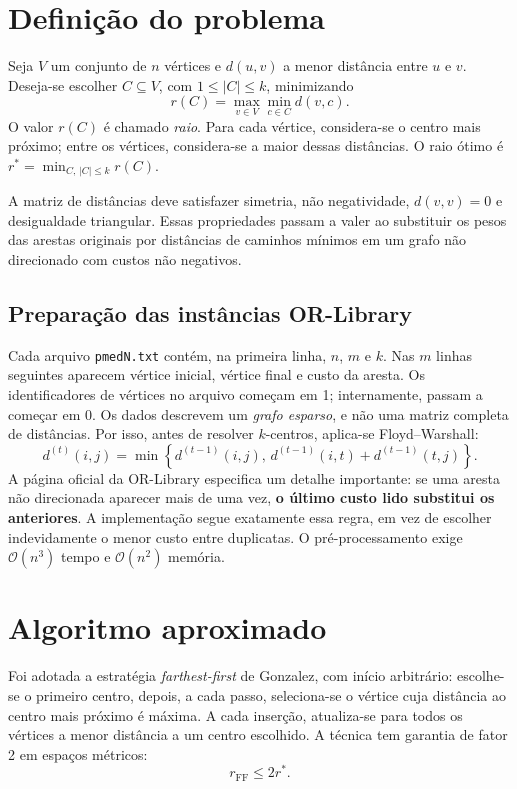 \documentclass[12pt,a4paper]{article}
\newcommand{\bigO}[1]{\mathcal O\!\left(#1\right)}
\begin{document}
\section{Definição do problema}
Seja $V$ um conjunto de $n$ vértices e $d(u,v)$ a menor distância entre
$u$ e $v$. Deseja-se escolher $C\subseteq V$, com $1\leq |C|\leq k$, minimizando
\begin{equation}\label{eq:objetivo}
 r(C)=\max_{v\in V}\min_{c\in C}d(v,c).
\end{equation}
O valor $r(C)$ é chamado \emph{raio}. Para cada vértice, considera-se o
centro mais próximo; entre os vértices, considera-se a maior dessas distâncias.
O raio ótimo é $r^*=\min_{C,\,|C|\leq k}r(C)$.

A matriz de distâncias deve satisfazer simetria, não negatividade,
$d(v,v)=0$ e desigualdade triangular. Essas propriedades passam a valer
ao substituir os pesos das arestas originais por distâncias de caminhos
mínimos em um grafo não direcionado com custos não negativos.

\subsection{Preparação das instâncias OR-Library}
Cada arquivo \texttt{pmedN.txt} contém, na primeira linha, $n$, $m$ e $k$.
Nas $m$ linhas seguintes aparecem vértice inicial, vértice final e custo
da aresta. Os identificadores de vértices no arquivo começam em 1;
internamente, passam a começar em 0. Os dados descrevem um \emph{grafo
esparso}, e não uma matriz completa de distâncias. Por isso, antes de
resolver $k$-centros, aplica-se Floyd--Warshall:
\begin{equation}
 d^{(t)}(i,j)=\min\left\{d^{(t-1)}(i,j),\,
 d^{(t-1)}(i,t)+d^{(t-1)}(t,j)\right\}.
\end{equation}
A página oficial da OR-Library especifica um detalhe importante: se uma
aresta não direcionada aparecer mais de uma vez, \textbf{o último custo
lido substitui os anteriores}. A implementação segue exatamente essa regra,
em vez de escolher indevidamente o menor custo entre duplicatas.
O pré-processamento exige $\bigO{n^3}$ tempo e $\bigO{n^2}$ memória.

\section{Algoritmo aproximado}
Foi adotada a estratégia \emph{farthest-first} de Gonzalez, com início
arbitrário: escolhe-se o primeiro centro, depois, a cada passo, seleciona-se
o vértice cuja distância ao centro mais próximo é máxima. A cada inserção,
atualiza-se para todos os vértices a menor distância a um centro escolhido.
A técnica tem garantia de fator 2 em espaços métricos:
\begin{equation}\label{eq:approx}
 r_{\mathrm{FF}}\leq 2r^*.
\end{equation}
\end{document}
